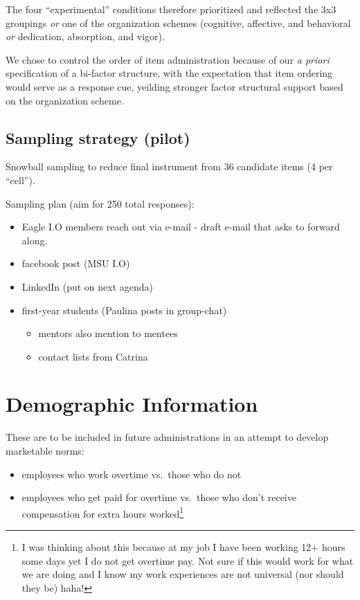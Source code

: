 \documentclass[
]{book}
\providecommand{\tightlist}{%
  \setlength{\itemsep}{0pt}\setlength{\parskip}{0pt}}
\begin{document}
The four ``experimental'' conditions therefore prioritized and reflected the 3x3 groupings \emph{or} one of the organization schemes (cognitive, affective, and behavioral \emph{or} dedication, absorption, and vigor).

We chose to control the order of item administration because of our \emph{a priori} specification of a bi-factor structure, with the expectation that item ordering would serve as a response cue, yeilding stronger factor structural support based on the organization scheme.

\hypertarget{sampling-strategy-pilot}{%
\subsection{Sampling strategy (pilot)}\label{sampling-strategy-pilot}}

Snowball sampling to reduce final instrument from 36 candidate items (4 per ``cell'').

Sampling plan (aim for 250 total responses):

\begin{itemize}
\tightlist
\item
  Eagle I.O members reach out via e-mail - draft e-mail that asks to forward along.
\item
  facebook post (MSU I.O)
\item
  LinkedIn (put on next agenda)
\item
  first-year students (Paulina posts in group-chat)

  \begin{itemize}
  \tightlist
  \item
    mentors also mention to mentees
  \item
    contact lists from Catrina
  \end{itemize}
\end{itemize}

\hypertarget{demographic-information}{%
\section{Demographic Information}\label{demographic-information}}

These are to be included in future administrations in an attempt to develop marketable norms:

\begin{itemize}
\tightlist
\item
  employees who work overtime vs.~those who do not
\item
  employees who get paid for overtime vs.~those who don't receive compensation for extra hours worked\footnote{I was thinking about this because at my job I have been working 12+ hours some days yet I do not get overtime pay. Not sure if this would work for what we are doing and I know my work experiences are not universal (nor should they be) haha!}
\end{itemize}
\end{document}

